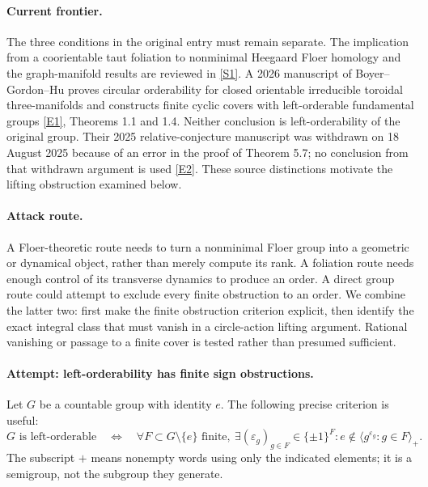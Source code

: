 \documentclass[11pt,a4paper]{article}
\newcommand{\eps}{\varepsilon}
\newcommand{\sref}[2]{\hyperlink{source:#1:#2}{[S#2]}}
\newcommand{\eref}[2]{\hyperlink{extra:#1:#2}{[E#2]}}
\numberwithin{equation}{section}
\begin{document}
\paragraph{Current frontier.}
The three conditions in the original entry must remain separate. The
implication from a coorientable taut foliation to nonminimal Heegaard Floer
homology and the graph-manifold results are reviewed in \sref{30006775}{1}.
A 2026 manuscript of Boyer--Gordon--Hu proves circular orderability for
closed orientable irreducible toroidal three-manifolds and constructs
finite cyclic covers with left-orderable fundamental groups
\eref{30006775}{1}, Theorems 1.1 and 1.4. Neither conclusion is left-orderability
of the original group. Their 2025 relative-conjecture manuscript was
withdrawn on 18 August 2025 because of an error in the proof of Theorem 5.7;
no conclusion from that withdrawn argument is used \eref{30006775}{2}.
These source distinctions motivate the lifting obstruction examined below.

\paragraph{Attack route.}
A Floer-theoretic route needs to turn a nonminimal Floer group into a
geometric or dynamical object, rather than merely compute its rank. A
foliation route needs enough control of its transverse dynamics to produce
an order. A direct group route could attempt to exclude every finite
obstruction to an order. We combine the latter two: first make the finite
obstruction criterion explicit, then identify the exact integral class
that must vanish in a circle-action lifting argument. Rational vanishing
or passage to a finite cover is tested rather than presumed sufficient.

\paragraph{Attempt: left-orderability has finite sign obstructions.}
Let $G$ be a countable group with identity $e$. The following precise
criterion is useful:
\begin{equation}\label{eq181-signs}
 G\text{ is left-orderable}\quad\Longleftrightarrow\quad
 \forall F\subset G\setminus\{e\}\text{ finite},\ \exists
 (\eps_g)_{g\in F}\in\{\pm1\}^{F}:
 e\notin\langle g^{\eps_g}:g\in F\rangle_+.
\end{equation}
The subscript $+$ means nonempty words using only the indicated elements;
it is a semigroup, not the subgroup they generate.
\end{document}
